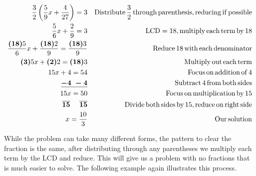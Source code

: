 \begin{example}\label{Lin32}
  \begin{eqnarray*}
    \frac{3}{2} \left( \frac{5}{9} x + \frac{4}{27} \right) = 3 &  &
    \operatorname{Distribute} \frac{3}{2} \operatorname{through} \operatorname{parenthesis},
    \operatorname{reducing} \operatorname{if} \operatorname{possible}\\
    \frac{5}{6} x + \frac{2}{9} = 3 &  & \operatorname{LCD} = 18, \operatorname{multiply}
    \operatorname{each} \operatorname{term} \operatorname{by} 18\\
    \frac{\boldsymbol{(18)} 5}{6} x + \frac{\boldsymbol{(18)} 2}{9} =
    \frac{\boldsymbol{(18)} 3}{9} &  & \operatorname{Reduce} 18 \operatorname{with} \operatorname{each}
    \operatorname{denominator}\\
    \boldsymbol{(3)} 5 x + \boldsymbol{(2)} 2 = \boldsymbol{(18)} 3 &  &
    \operatorname{Multiply} \operatorname{out} \operatorname{each} \operatorname{term}\\
    15 x + 4 = 54 &  & \operatorname{Focus} \operatorname{on} \operatorname{addition} \operatorname{of} 4\\
    \underline{\boldsymbol{- 4 ~- 4}} &  & \operatorname{Subtract} 4 \operatorname{from}
    \operatorname{both} \operatorname{sides}\\
    15 x = 50 &  & \operatorname{Focus} \operatorname{on} \operatorname{multiplication} \operatorname{by} 15\\
     \boldsymbol{\overline{15} ~~~~ \overline{15}} &  & \operatorname{Divide} \operatorname{both}
    \operatorname{sides} \operatorname{by} 15, \operatorname{reduce} \operatorname{on} \operatorname{right}
    \operatorname{side}\\
    x = \frac{10}{3} &  & \operatorname{Our} \operatorname{solution}
  \end{eqnarray*}
\end{example}

 While the problem can take many different forms, the pattern to clear the
fraction is the same, after distributing through any parentheses we multiply
each term by the LCD and reduce. This will give us a problem with no fractions
that is much easier to solve. The following example again illustrates this
process.

